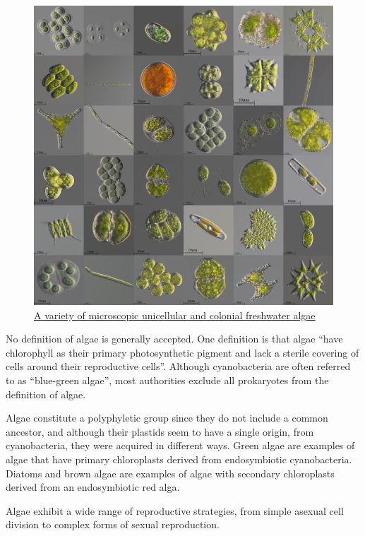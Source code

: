 \begin{figure}

{\centering \includegraphics[width=0.7\linewidth]{./figures/protista/algae_collection} 

}

\caption{\href{https://commons.wikimedia.org/wiki/File:Водоросли_пресноводного_водоема.jpg}{A variety of microscopic unicellular and colonial freshwater algae}}\label{fig:algaecollection}
\end{figure}

No definition of algae is generally accepted. One definition is that algae ``have chlorophyll as their primary photosynthetic pigment and lack a sterile covering of cells around their reproductive cells''. Although cyanobacteria are often referred to as ``blue-green algae'', most authorities exclude all prokaryotes from the definition of algae.

Algae constitute a polyphyletic group since they do not include a common ancestor, and although their plastids seem to have a single origin, from cyanobacteria, they were acquired in different ways. Green algae are examples of algae that have primary chloroplasts derived from endosymbiotic cyanobacteria. Diatoms and brown algae are examples of algae with secondary chloroplasts derived from an endosymbiotic red alga.

Algae exhibit a wide range of reproductive strategies, from simple asexual cell division to complex forms of sexual reproduction.



